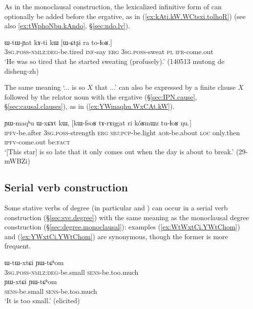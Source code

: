As in the monoclausal construction, the lexicalized infinitive form  of  can optionally be added before the ergative, as in (\ref{ex:kAti.kW.WCtsxi.tolhoR}) (see also \ref{ex:tWphoNbu.kAndo}, §\ref{sec:ndo.lv}).
 
\begin{exe}
\ex \label{ex:kAti.kW.WCtsxi.tolhoR}
\gll ɯ-tɯ-ɲat kɤ-ti kɯ [ɯ-ɕtʂi ra to-ɬoʁ.] \\
\textsc{3sg}.\textsc{poss}-\textsc{nmlz}:\textsc{deg}-be.tired \textsc{inf}-say \textsc{erg} \textsc{3sg}.\textsc{poss}-sweat \textsc{pl} \textsc{ifr}-come.out \\
\glt `He was so tired that he started sweating (profusely).' (140513 mutong de disheng-zh)
\end{exe}

The same meaning `... is so $X$ that ...' can also be expressed by a finite clause $X$ followed by the relator noun  with the ergative  (§\ref{sec:IPN.cause}, §\ref{sec:causal.clauses}), as in (\ref{ex:YWmaqhu.WxCAt.kW}). 
\largerpage
\begin{exe}
\ex \label{ex:YWmaqhu.WxCAt.kW}
\gll ɲɯ-maqʰu ɯ-xɕɤt kɯ, [kɯ-fsoʁ tɤ-rɤŋgat ri kóʁmɯz tu-ɬoʁ ŋu.] \\
\textsc{ipfv}-be.after \textsc{3sg}.\textsc{poss}-strength \textsc{erg} \textsc{sbj}:\textsc{pcp}-be.light \textsc{aor}-be.about \textsc{loc} only.then \textsc{ipfv}-come.out be:\textsc{fact} \\
\glt `[This star] is so late that it only comes out when the day is about to break.' (29-mWBZi)
\end{exe}


\subsection{Serial verb construction} \label{sec:degree.svc}
Some stative verbs of degree (in particular  and ) can occur in a serial verb construction (§\ref{sec:svc.degree}) with the same meaning as the monoclausal degree construction (§\ref{sec:degree.monoclausal}): examples (\ref{ex:WtWxtCi.YWtChom}) and (\ref{ex:YWxtCi.YWtChom}) are synonymous, though the former is more frequent.

\begin{exe}
\ex 
\begin{xlist}
\ex  \label{ex:WtWxtCi.YWtChom}
\gll ɯ-tɯ-xtɕi ɲɯ-tɕʰom \\
\textsc{3sg}.\textsc{poss}-\textsc{nmlz}:\textsc{deg}-be.small \textsc{sens}-be.too.much \\
\ex  \label{ex:YWxtCi.YWtChom}
\gll ɲɯ-xtɕi ɲɯ-tɕʰom \\
\textsc{sens}-be.small \textsc{sens}-be.too.much \\
\glt `It is too small.' (elicited)
\end{xlist}
\end{exe}

